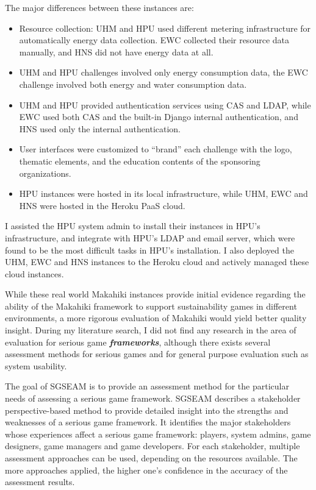 The major differences between these instances are:
\begin{itemize}
\item Resource collection: UHM and HPU used different metering infrastructure for automatically energy data collection. EWC collected their resource data manually, and HNS did not have energy data at all. 
\item UHM and HPU challenges involved only energy consumption data, the EWC challenge involved both energy and water consumption data. 
\item UHM and HPU provided authentication services using CAS and LDAP, while EWC used both CAS and the built-in Django internal  authentication, and HNS used only the internal authentication.
\item User interfaces were customized to ``brand'' each challenge with the logo, thematic elements, and the education contents of the sponsoring organizations.
\item HPU instances were hosted in its local infrastructure, while UHM, EWC and HNS were hosted in the Heroku PaaS cloud.
\end{itemize}

I assisted the HPU system admin to install their instances in HPU's infrastructure, and integrate with HPU's LDAP and email server, which were found to be the most difficult tasks in HPU's installation. I also deployed the UHM, EWC and HNS instances to the Heroku cloud and actively managed these cloud instances. 

While these real world Makahiki instances provide initial evidence regarding the ability of the Makahiki framework to support sustainability games in different environments, a more rigorous evaluation of Makahiki would yield better quality insight. During my literature search, I did not find any research in the area of  evaluation for serious game {\em \bf frameworks}, although there exists several assessment methods for serious games and for general purpose evaluation such as system usability. 

The goal of SGSEAM is to provide an assessment method for the particular needs of assessing a serious game framework. SGSEAM describes a stakeholder perspective-based method to provide detailed insight into the strengths and weaknesses of a serious game framework. It identifies the major stakeholders whose experiences affect a serious game framework: players, system admins, game designers, game managers and game developers. For each stakeholder, multiple assessment approaches can be used, depending on the resources available. The more approaches applied, the higher one's confidence in the accuracy of the assessment results.

